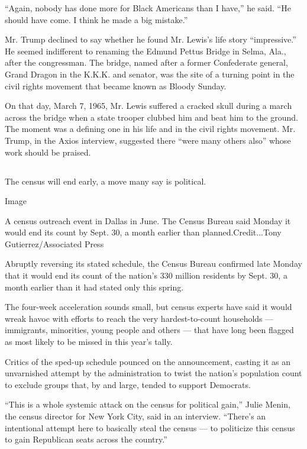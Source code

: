 ``Again, nobody has done more for Black Americans than I have,'' he
said. ``He should have come. I think he made a big mistake.''

Mr. Trump declined to say whether he found Mr. Lewis's life story
``impressive.'' He seemed indifferent to renaming the Edmund Pettus
Bridge in Selma, Ala., after the congressman. The bridge, named after a
former Confederate general, Grand Dragon in the K.K.K. and senator, was
the site of a turning point in the civil rights movement that became
known as Bloody Sunday.

On that day, March 7, 1965, Mr. Lewis suffered a cracked skull during a
march across the bridge when a state trooper clubbed him and beat him to
the ground. The moment was a defining one in his life and in the civil
rights movement. Mr. Trump, in the Axios interview, suggested there
``were many others also'' whose work should be praised.

\hypertarget{section-10}{%
\subsection{}\label{section-10}}

The census will end early, a move many say is political.

Image

A census outreach event in Dallas in June. The Census Bureau said Monday
it would end its count by Sept. 30, a month earlier than
planned.Credit...Tony Gutierrez/Associated Press

Abruptly reversing its stated schedule, the Census Bureau confirmed late
Monday that it would end its count of the nation's 330 million residents
by Sept. 30, a month earlier than it had stated only this spring.

The four-week acceleration sounds small, but census experts have said it
would wreak havoc with efforts to reach the very hardest-to-count
households --- immigrants, minorities, young people and others --- that
have long been flagged as most likely to be missed in this year's tally.

Critics of the sped-up schedule pounced on the announcement, casting it
as an unvarnished attempt by the administration to twist the nation's
population count to exclude groups that, by and large, tended to support
Democrats.

``This is a whole systemic attack on the census for political gain,''
Julie Menin, the census director for New York City, said in an
interview. ``There's an intentional attempt here to basically steal the
census --- to politicize this census to gain Republican seats across the
country.''

